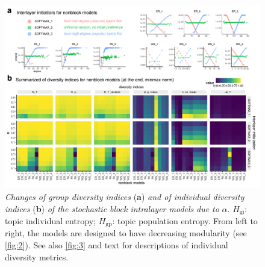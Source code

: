 \begin{figure}[!ht]
    \centering
    \includegraphics[width=\textwidth]{figures/FigS2.pdf}
    \caption{\label{fig:5}
    \textit{Changes of group diversity indices} (\textbf{a}) \textit{and of individual diversity indices} (\textbf{b}) \textit{of the stochastic block intralayer models} \textit{due to} $\alpha$. $H_{\mathrm{gi}}$: topic individual entropy; $H_{\mathrm{gp}}$: topic population entropy. From left to right, the models are designed to have decreasing modularity (see \ref{fig:2}). See also \ref{fig:3} and text for descriptions of individual diversity metrics.
    }
\end{figure}